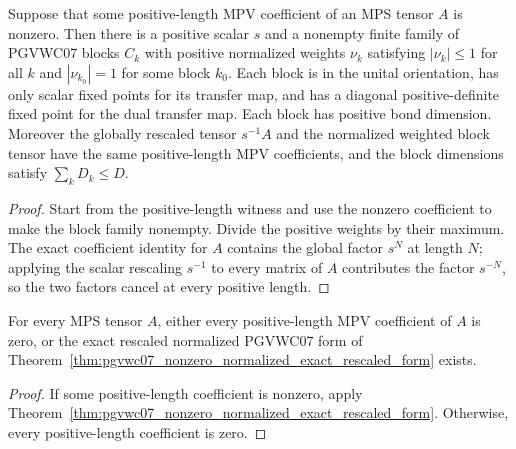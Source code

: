 \begin{theorem}%
    \label{thm:pgvwc07_nonzero_normalized_exact_rescaled_form}
    \leanok
    Suppose that some positive-length MPV coefficient of an MPS tensor $A$ is
    nonzero. Then there is a positive scalar $s$ and a nonempty finite family
    of PGVWC07 blocks $C_k$ with positive normalized weights $\nu_k$
    satisfying $|\nu_k|\leq 1$ for all $k$ and
    $|\nu_{k_0}|=1$ for some block $k_0$. Each block is in the unital
    orientation, has only scalar fixed points for its transfer map, and has a
    diagonal positive-definite fixed point for the dual transfer map. Each
    block has positive bond dimension. Moreover the globally rescaled tensor
    $s^{-1}A$ and the normalized weighted block tensor have the same
    positive-length MPV coefficients, and the block dimensions satisfy
    $\sum_k D_k\leq D$.
\end{theorem}
\begin{proof}\leanok
    Start from the positive-length witness and use the nonzero coefficient to
    make the block family nonempty. Divide the positive weights by their
    maximum. The exact coefficient identity for $A$ contains the global
    factor $s^N$ at length $N$; applying the scalar rescaling $s^{-1}$ to
    every matrix of $A$ contributes the factor $s^{-N}$, so the two factors
    cancel at every positive length.
\end{proof}

\begin{theorem}%
    \label{thm:pgvwc07_exact_rescaled_form_zero_nonzero_dichotomy}
    \leanok
    For every MPS tensor $A$, either every positive-length MPV coefficient of
    $A$ is zero, or the exact rescaled normalized PGVWC07 form of
    Theorem~\ref{thm:pgvwc07_nonzero_normalized_exact_rescaled_form} exists.
\end{theorem}
\begin{proof}\leanok
    If some positive-length coefficient is nonzero, apply
    Theorem~\ref{thm:pgvwc07_nonzero_normalized_exact_rescaled_form}. Otherwise,
    every positive-length coefficient is zero.
\end{proof}


